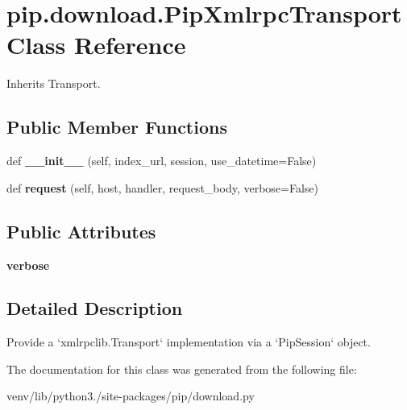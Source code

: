 \hypertarget{classpip_1_1download_1_1_pip_xmlrpc_transport}{}\section{pip.\+download.\+Pip\+Xmlrpc\+Transport Class Reference}
\label{classpip_1_1download_1_1_pip_xmlrpc_transport}


Inherits Transport.

\subsection*{Public Member Functions}
\begin{DoxyCompactItemize}
\item 
\mbox{\label{classpip_1_1download_1_1_pip_xmlrpc_transport_abe585061348fc9d9b972c9a94dd6da7d}} 
def {\bfseries \+\_\+\+\_\+init\+\_\+\+\_\+} (self, index\+\_\+url, session, use\+\_\+datetime=False)
\item 
\mbox{\label{classpip_1_1download_1_1_pip_xmlrpc_transport_abff49bb67fbb04cc47d473a8436da068}} 
def {\bfseries request} (self, host, handler, request\+\_\+body, verbose=False)
\end{DoxyCompactItemize}
\subsection*{Public Attributes}
\begin{DoxyCompactItemize}
\item 
\mbox{\label{classpip_1_1download_1_1_pip_xmlrpc_transport_a514590159bec49fc1d3233be4d16bbf5}} 
{\bfseries verbose}
\end{DoxyCompactItemize}


\subsection{Detailed Description}
\begin{DoxyVerb}Provide a `xmlrpclib.Transport` implementation via a `PipSession`
object.
\end{DoxyVerb}
 

The documentation for this class was generated from the following file\+:\begin{DoxyCompactItemize}
\item 
venv/lib/python3./site-\/packages/pip/download.\+py\end{DoxyCompactItemize}
